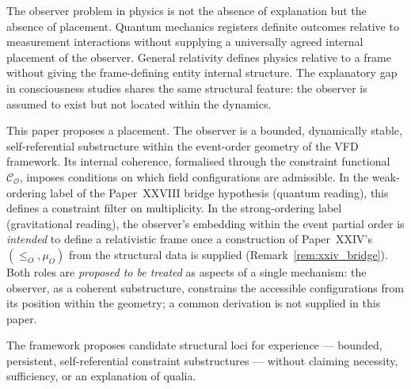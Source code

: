 \documentclass[12pt]{article}
\newcommand{\Ocal}{\mathcal{O}}
\newcommand{\Ccal}{\mathcal{C}}
\begin{document}
The observer problem in physics is not the absence of explanation but the absence of placement. Quantum mechanics registers definite outcomes relative to measurement interactions without supplying a universally agreed internal placement of the observer. General relativity defines physics relative to a frame without giving the frame-defining entity internal structure. The explanatory gap in consciousness studies shares the same structural feature: the observer is assumed to exist but not located within the dynamics.

This paper proposes a placement. The observer is a bounded, dynamically stable, self-referential substructure within the event-order geometry of the VFD framework. Its internal coherence, formalised through the constraint functional $\Ccal_\Ocal$, imposes conditions on which field configurations are admissible. In the weak-ordering label of the Paper~XXVIII bridge hypothesis (quantum reading), this defines a constraint filter on multiplicity. In the strong-ordering label (gravitational reading), the observer's embedding within the event partial order is \emph{intended} to define a relativistic frame once a construction of Paper~XXIV's $(\leq_O, \mu_O)$ from the structural data is supplied (Remark~\ref{rem:xxiv_bridge}). Both roles are \emph{proposed to be treated} as aspects of a single mechanism: the observer, as a coherent substructure, constrains the accessible configurations from its position within the geometry; a common derivation is not supplied in this paper.

The framework proposes candidate structural loci for experience --- bounded, persistent, self-referential constraint substructures --- without claiming necessity, sufficiency, or an explanation of qualia.




\end{document}
